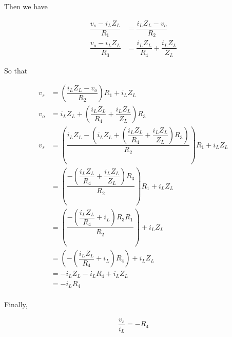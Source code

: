 \documentclass{article}
\begin{document}
Then we have

\begin{equation*}
  \begin{aligned}
    \dfrac{v_s - i_L Z_L}{R_1} &= \dfrac{i_L Z_L - v_o}{R_2} \\
    \dfrac{v_o - i_L Z_L}{R_3} &= \dfrac{i_L Z_L}{R_4} + \dfrac{i_L Z_L}{Z_L}  
  \end{aligned}
\end{equation*}

So that

\begin{equation*}
  \begin{aligned}
    v_s &= \left( \dfrac{i_L Z_L - v_o}{R_2} \right) R_1 + i_L Z_L \\
    v_o &= i_L Z_L + \left( \dfrac{i_L Z_L}{R_4} + \dfrac{i_L Z_L}{Z_L} \right) R_3 \\
    v_s &= \left( \dfrac{i_L Z_L - \left( i_L Z_L + \left( \dfrac{i_L Z_L}{R_4} + \dfrac{i_L Z_L}{Z_L} \right) R_3 \right)}{R_2} \right) R_1 + i_L Z_L \\
    &= \left( \dfrac{ - \left( \dfrac{i_L Z_L}{R_4} + \dfrac{i_L Z_L}{Z_L} \right) R_3 }{R_2} \right) R_1 + i_L Z_L \\
    &= \left( \dfrac{ - \left( \dfrac{i_L Z_L}{R_4} + i_L \right) R_3 R_1 }{R_2} \right) + i_L Z_L \\
    &= \left( - \left( \dfrac{i_L Z_L}{R_4} + i_L \right) R_4 \right) + i_L Z_L \\
    &= - i_L Z_L - i_L R_4 + i_L Z_L \\
    &= - i_L R_4 \\
  \end{aligned}
\end{equation*}

Finally,

\begin{equation*}
  \begin{aligned}
    \dfrac{v_s}{i_L} = - R_4 
  \end{aligned}
\end{equation*}
\end{document}
